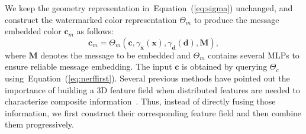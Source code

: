 \documentclass[10pt,twocolumn,letterpaper]{article}
\newcommand{\Eref}[1]{Equation~(\ref{#1})}
\begin{document}
We keep the geometry representation in~\Eref{eq:sigma} unchanged, and construct the watermarked color representation $\Theta_{m}$ to produce the message embedded color $\mathbf{c}_m$ as follows:
\begin{equation}
\mathbf{c}_m=\Theta_{m}\left(\mathbf{c},\gamma_{\mathbf{x}}(\mathbf{x}), \gamma_{\mathbf{d}}(\mathbf{d}), \mathbf{M}\right),
\end{equation}
where $\mathbf{M}$ denotes the message to be embedded and $\Theta_{m}$ contains several MLPs to ensure reliable message embedding. The input $\mathbf{c}$ is obtained by querying $\Theta_{c}$ using~\Eref{eq:nerffirst}. Several previous methods have pointed out the importance of building a 3D feature field when distributed features are needed to characterize 
composite information~\cite{xu20223d,chan2022efficient}. Thus, instead of directly fusing those information, we first construct their corresponding feature field and then combine them progressively.







\end{document}
